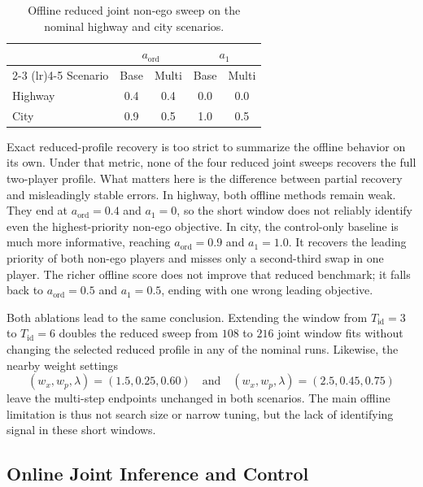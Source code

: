 \begin{table}[!htbp]
    \centering
    \caption{Offline reduced joint non-ego sweep on the nominal highway and city scenarios.}
    \label{tab:inverse_offline_metrics}
    \begin{tabular}{lcccc}
        & \multicolumn{2}{c}{$a_{\mathrm{ord}}$} & \multicolumn{2}{c}{$a_1$} \\
        \cmidrule(lr){2-3} \cmidrule(lr){4-5}
        Scenario & Base & Multi & Base & Multi \\
        \midrule
        Highway & 0.4 & 0.4 & 0.0 & 0.0 \\
        City    & 0.9 & 0.5 & 1.0 & 0.5 \\
        \bottomrule
    \end{tabular}
\end{table}

Exact reduced-profile recovery is too strict to summarize the offline behavior on its own.
Under that metric, none of the four reduced joint sweeps recovers the full two-player profile.
What matters here is the difference between partial recovery and misleadingly stable errors.
In highway, both offline methods remain weak. They end at $a_{\mathrm{ord}} = 0.4$ and $a_1 = 0$, so the short
window does not reliably identify even the highest-priority non-ego objective.
In city, the control-only baseline is much more informative, reaching $a_{\mathrm{ord}} = 0.9$ and $a_1 = 1.0$.
It recovers the leading priority of both non-ego players and misses only a second-third swap in one player.
The richer offline score does not improve that reduced benchmark; it falls back to $a_{\mathrm{ord}} = 0.5$ and
$a_1 = 0.5$, ending with one wrong leading objective.

Both ablations lead to the same conclusion.
Extending the window from $T_{\mathrm{id}} = 3$ to $T_{\mathrm{id}} = 6$ doubles the reduced sweep from $108$ to
$216$ joint window fits without changing the selected reduced profile in any of the nominal runs.
Likewise, the nearby weight settings
\[
(w_x, w_p, \lambda) = (1.5, 0.25, 0.60)
\quad\text{and}\quad
(w_x, w_p, \lambda) = (2.5, 0.45, 0.75)
\]
leave the multi-step endpoints unchanged in both scenarios.
The main offline limitation is thus not search size or narrow tuning, but the lack of identifying
signal in these short windows.

\subsection{Online Joint Inference and Control}

